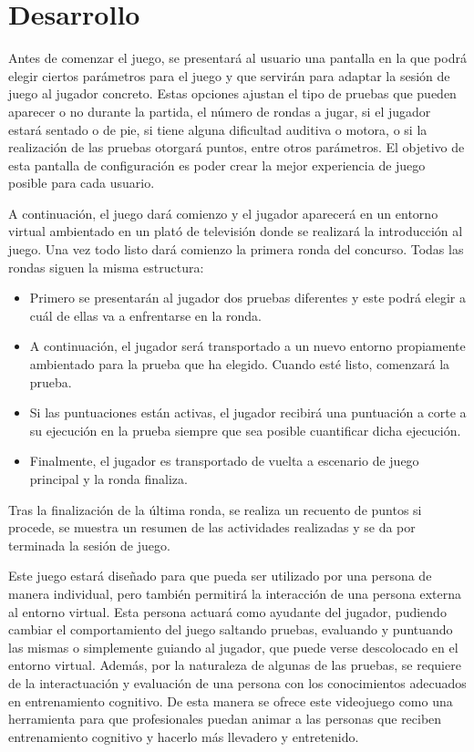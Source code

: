 \section{Desarrollo}


Antes de comenzar el juego, se presentará al usuario una pantalla en la que podrá elegir ciertos parámetros para el juego y que servirán para adaptar la sesión de juego al jugador concreto. Estas opciones ajustan el tipo de pruebas que pueden aparecer o no durante la partida, el número de rondas a jugar, si el jugador estará sentado o de pie, si tiene alguna dificultad auditiva o motora, o si la realización de las pruebas otorgará puntos, entre otros parámetros. El objetivo de esta pantalla de configuración es poder crear la mejor experiencia de juego posible para cada usuario.

A continuación, el juego dará comienzo y el jugador aparecerá en un entorno virtual ambientado en un plató de televisión donde se realizará la introducción al juego. Una vez todo listo dará comienzo la primera ronda del concurso. Todas las rondas siguen la misma estructura:


\begin{itemize}
	\item{Primero se presentarán al jugador dos pruebas diferentes y este podrá elegir a cuál de ellas va a enfrentarse en la ronda.}

	\item{A continuación, el jugador será transportado a un nuevo entorno propiamente ambientado para la prueba que ha elegido. Cuando esté listo, comenzará la prueba.}

	\item{Si las puntuaciones están activas, el jugador recibirá una puntuación a corte a su ejecución en la prueba siempre que sea posible cuantificar dicha ejecución.}
	
	\item{Finalmente, el jugador es transportado de vuelta a escenario de juego principal y la ronda finaliza.}

\end{itemize}

Tras la finalización de la última ronda, se realiza un recuento de puntos si procede, se muestra un resumen de las actividades realizadas y se da por terminada la sesión de juego.


Este juego estará diseñado para que pueda ser utilizado por una persona de manera individual, pero también permitirá la interacción de una persona externa al entorno virtual. Esta persona actuará como ayudante del jugador, pudiendo cambiar el comportamiento del juego saltando pruebas, evaluando y puntuando las mismas o simplemente guiando al jugador, que puede verse descolocado en el entorno virtual. Además, por la naturaleza de algunas de las pruebas, se requiere de la interactuación y evaluación de una persona con los conocimientos adecuados en entrenamiento cognitivo. De esta manera se ofrece este videojuego como una herramienta para que profesionales puedan animar a las personas que reciben entrenamiento cognitivo y hacerlo más llevadero y entretenido.

\chapterend